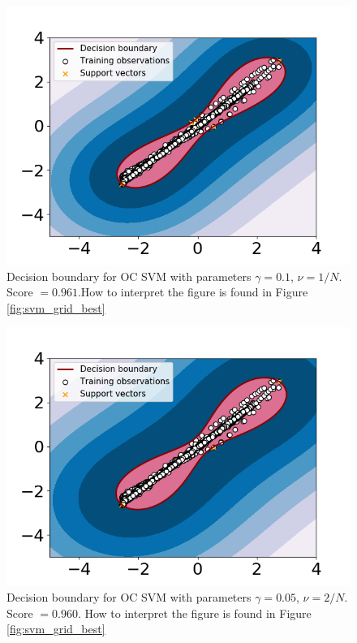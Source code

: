     \begin{figure}
        \centering
        \includegraphics[width = .7\textwidth]{report/figures/analysis/gridsearch/Novelty detection, 3 training, gamma = 0.1 nu = 0.00010583130489998942.png}
        \caption{Decision boundary for OC SVM with parameters $\gamma = 0.1$, $\nu = 1/N$. Score $=0.961$.How to interpret the figure is found in Figure \ref{fig:svm_grid_best}}
        \label{fig:my_label}
    \end{figure}
    
    \begin{figure}
        \centering
        \includegraphics[width = .7\textwidth]{report/figures/analysis/gridsearch/Novelty detection, 4 training, gamma = 0.05 nu = 0.00021166260979997884.png}
        \caption{Decision boundary for OC SVM with parameters $\gamma = 0.05$, $\nu = 2/N$. Score $=0.960$. How to interpret the figure is found in Figure \ref{fig:svm_grid_best}}
        \label{fig:my_label}
    \end{figure}
    
